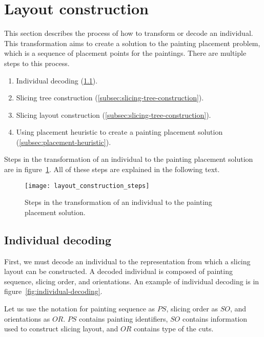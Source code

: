 \newpage


\section{Layout construction}\label{sec:layout-construction}

This section describes the process of how to transform or decode an individual.
This transformation aims to create a solution to the painting placement problem,
which is a sequence of placement points for the paintings.
There are multiple steps to this process.

\begin{enumerate}
    \item Individual decoding (\ref{subsec:individual-decoding}).
    \item Slicing tree construction (\ref{subsec:slicing-tree-construction}).
    \item Slicing layout construction (\ref{subsec:slicing-tree-construction}).
    \item Using placement heuristic to create a painting placement solution (\ref{subsec:placement-heuristic}).
\end{enumerate}

Steps in the transformation of an individual to the painting placement solution are
in figure~\ref{fig:layout-construction-steps}.
All of these steps are explained in the following text.


\begin{figure}[h!]
    \texttt{[image: layout\_construction\_steps]}
    \caption[Transformation of an individual to the painting placement solution]
    {Steps in the transformation of an individual to the painting placement solution.}
    \label{fig:layout-construction-steps}
\end{figure}

\subsection{Individual decoding}\label{subsec:individual-decoding}
First, we must decode an individual to the representation from which a slicing layout can be constructed.
A decoded individual is composed of painting sequence, slicing order, and orientations.
An example of individual decoding is in figure~\ref{fig:individual-decoding}.

Let us use the notation for painting sequence as $PS$, slicing order as $SO$, and orientations as $OR$.
$PS$ contains painting identifiers, $SO$ contains information used to construct slicing layout,
and $OR$ contains type of the cuts.\\

